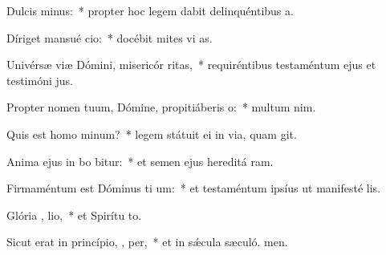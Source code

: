 \item Dulcis   minus:~* propter hoc legem dabit delinquéntibus  a.
\item Díriget mansué  cio:~* docébit mites vi as.
\item Univérsæ viæ Dómini, misericór  ritas,~* requiréntibus testaméntum ejus et testimóni jus.
\item Propter nomen tuum, Dómine, propitiáberis  o:~* multum  nim.
\item Quis est homo   minum?~* legem státuit ei in via, quam git.
\item Anima ejus in bo bitur:~* et semen ejus hereditá ram.
\item Firmaméntum est Dóminus ti um:~* et testaméntum ipsíus ut manifesté lis.
\item Glória ,  lio,~* et Spirítu to.
\item Sicut erat in princípio,  ,  per,~* et in sǽcula sæculó. men.
